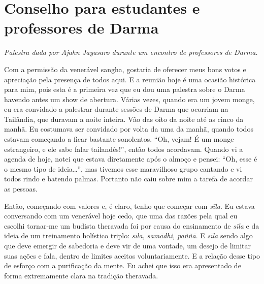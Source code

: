 
\chapter{Conselho para estudantes e professores de Darma}

{\itshape
Palestra dada por Ajahn Jayasaro durante um encontro de professores de
Darma.}

Com a permissão da venerável sangha, gostaria de oferecer meus bons
votos e apreciação pela presença de todos aqui. E a reunião hoje é uma
ocasião histórica para mim, pois esta é a primeira vez que eu dou uma
palestra sobre o Darma havendo antes um show de abertura. Várias vezes,
quando era um jovem monge, eu era convidado a palestrar durante sessões
de Darma que ocorriam na Tailândia, que duravam a noite inteira. Vão
das oito da noite até as cinco da manhã. Eu costumava ser convidado por
volta da uma da manhã, quando todos estavam começando a ficar bastante
sonolentos. “Oh, vejam! É um monge estrangeiro, e ele sabe falar
tailandês!”, então todos acordavam. Quando vi a agenda de hoje, notei
que estava diretamente após o almoço e pensei: “Oh, esse é o mesmo tipo
de ideia…”, mas tivemos esse maravilhoso grupo cantando e vi todos
rindo e batendo palmas. Portanto não caiu sobre mim a tarefa de acordar
as pessoas. 

Então, começando com valores e, é claro, tenho que começar com
\textit{sīla}. Eu estava conversando com um venerável hoje cedo, que
uma das razões pela qual eu escolhi tornar-me um budista theravada foi
por causa do ensinamento de \textit{sīla }e da ideia de um
treinamento holístico triplo: \textit{sīla, samādhi, paññā}. E
\textit{sīla} sendo algo que deve emergir de sabedoria e deve vir de
uma vontade, um desejo de limitar suas ações e fala, dentro de limites
aceitos voluntariamente. E a relação desse tipo de esforço com a
purificação da mente. Eu achei que isso era apresentado de forma
extremamente clara na tradição theravada. 

